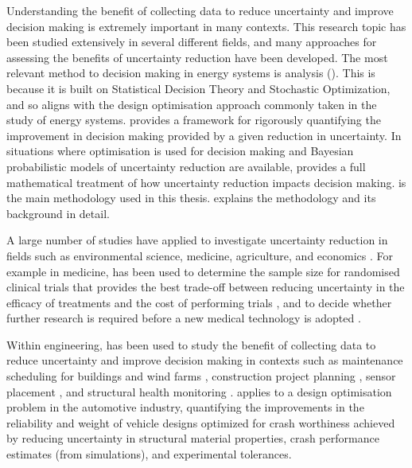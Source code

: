 Understanding the benefit of collecting data to reduce uncertainty and improve decision making is extremely important in many contexts. This research topic has been studied extensively in several different fields, and many approaches for assessing the benefits of uncertainty reduction have been developed. The most relevant method to decision making in energy systems is  analysis (). This is because it is built on Statistical Decision Theory and Stochastic Optimization, and so aligns with the design optimisation approach commonly taken in the study of energy systems.  provides a framework for rigorously quantifying the improvement in decision making provided by a given reduction in uncertainty. In situations where optimisation is used for decision making and Bayesian probabilistic models of uncertainty reduction are available,  provides a full mathematical treatment of how uncertainty reduction impacts decision making.  is the main methodology used in this thesis.  explains the methodology and its background in detail.

A large number of studies have applied  to investigate uncertainty reduction in fields such as environmental science, medicine, agriculture, and economics . For example in medicine,  has been used to determine the sample size for randomised clinical trials that provides the best trade-off between reducing uncertainty in the efficacy of treatments and the cost of performing trials , and to decide whether further research is required before a new medical technology is adopted .

Within engineering,  has been used to study the benefit of collecting data to reduce uncertainty and improve decision making in contexts such as maintenance scheduling for buildings  and wind farms , construction project planning , sensor placement , and structural health monitoring .
 applies  to a design optimisation problem in the automotive industry, quantifying the improvements in the reliability and weight of vehicle designs optimized for crash worthiness achieved by reducing uncertainty in structural material properties, crash performance estimates (from simulations), and experimental tolerances.\\

